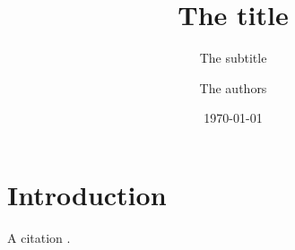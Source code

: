 \documentclass[
  draft=false,
  titlepage=false,
  fontsize=11pt,
  abstract=true,
  headsepline=false, 
  footsepline=false,
]{scrartcl}
\title{The title}
\subtitle{The subtitle}
\author{The authors}
\date{\today}
\begin{document}
\nocite{*}

\maketitle

\begin{abstract}
\lipsum[1]
\end{abstract}

\section{Introduction}
\lipsum[2-3]

A citation \cite{something}.



\end{document}
